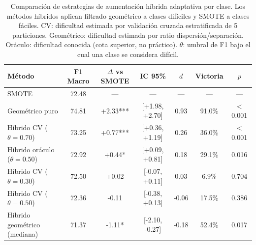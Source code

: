 \begin{table}[htbp]
\centering
\small
\caption{Comparación de estrategias de aumentación híbrida adaptativa por clase. Los métodos híbridos aplican filtrado geométrico a clases difíciles y SMOTE a clases fáciles. CV: dificultad estimada por validación cruzada estratificada de 5 particiones. Geométrico: dificultad estimada por ratio dispersión/separación. Oráculo: dificultad conocida (cota superior, no práctico). $\theta$: umbral de F1 bajo el cual una clase se considera difícil.}
\label{tab:hybrid_comparison}
\setlength{\tabcolsep}{4pt}
\begin{tabular}{lcccccc}
\toprule
\textbf{Método} & \textbf{F1 Macro} & \textbf{$\Delta$ vs SMOTE} & \textbf{IC 95\%} & \textbf{$d$} & \textbf{Victoria} & \textbf{$p$} \\
\midrule
SMOTE & 72.48 & --- & --- & --- & --- & --- \\
\rowcolor{green!10}Geométrico puro & 74.81 & +2.33*** & [+1.98, +2.70] & 0.93 & 91.0\% & $<$0.001 \\
Híbrido CV ($\theta=0.70$) & 73.25 & +0.77*** & [+0.36, +1.19] & 0.26 & 36.0\% & $<$0.001 \\
Híbrido oráculo ($\theta=0.50$) & 72.92 & +0.44* & [+0.09, +0.81] & 0.18 & 29.1\% & 0.016 \\
Híbrido CV ($\theta=0.30$) & 72.50 & +0.02 & [-0.07, +0.11] & 0.03 & 6.9\% & 0.704 \\
Híbrido CV ($\theta=0.50$) & 72.36 & -0.11 & [-0.38, +0.13] & -0.06 & 17.5\% & 0.386 \\
Híbrido geométrico (mediana) & 71.37 & -1.11* & [-2.10, -0.27] & -0.18 & 52.4\% & 0.017 \\
\bottomrule
\end{tabular}
\end{table}
